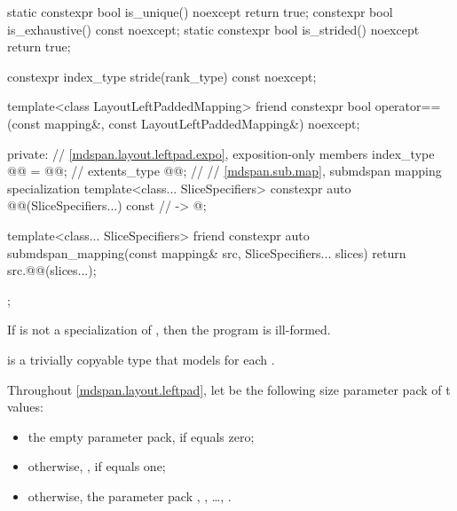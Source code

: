 \begin{codeblock}
{{    static constexpr bool is_unique() noexcept { return true; }
    constexpr bool is_exhaustive() const noexcept;
    static constexpr bool is_strided() noexcept { return true; }

    constexpr index_type stride(rank_type) const noexcept;

    template<class LayoutLeftPaddedMapping>
      friend constexpr bool operator==(const mapping&, const LayoutLeftPaddedMapping&) noexcept;

  private:
    // \ref{mdspan.layout.leftpad.expo}, exposition-only members
    index_type @@ = @@;                           // \expos
    extents_type @@{};                                               // \expos
    // \ref{mdspan.sub.map}, submdspan mapping specialization
    template<class... SliceSpecifiers>
      constexpr auto @@(SliceSpecifiers...) const     // \expos
        -> @\seebelow@;

    template<class... SliceSpecifiers>
      friend constexpr auto submdspan_mapping(const mapping& src, SliceSpecifiers... slices) {
      return src.@@(slices...);
    }
  };
}
\end{codeblock}

\pnum
If  is not a specialization of ,
then the program is ill-formed.

\pnum
{} is a trivially copyable type
that models  for each .

\pnum
Throughout \ref{mdspan.layout.leftpad},
let  be the following
size  parameter pack of t values:
\begin{itemize}
\item
the empty parameter pack, if  equals zero;
\item
\tcode otherwise, , if  equals one;
\item
otherwise, the parameter pack , , \ldots, .
\end{itemize}

